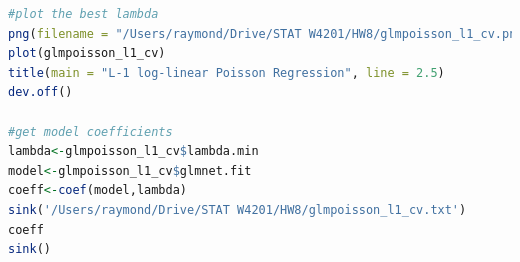 \documentclass[10pt,letterpaper]{article}
\begin{document}
\begin{lstlisting}[language=R]
#plot the best lambda
png(filename = "/Users/raymond/Drive/STAT W4201/HW8/glmpoisson_l1_cv.png")
plot(glmpoisson_l1_cv)
title(main = "L-1 log-linear Poisson Regression", line = 2.5)
dev.off()

#get model coefficients
lambda<-glmpoisson_l1_cv$lambda.min
model<-glmpoisson_l1_cv$glmnet.fit
coeff<-coef(model,lambda)
sink('/Users/raymond/Drive/STAT W4201/HW8/glmpoisson_l1_cv.txt')
coeff
sink()
\end{lstlisting}
\end{document}

